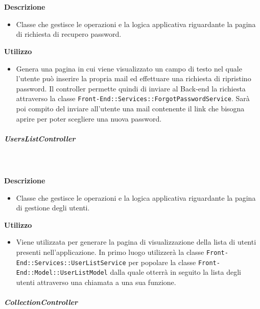         \textbf{\\ \\ Descrizione} 
          \begin{itemize}
            \item[] Classe che gestisce le operazioni e la logica applicativa riguardante la pagina di richiesta di recupero password.
          \end{itemize}      
        \textbf{Utilizzo}  
          \begin{itemize}
            \item[] Genera una pagina in cui viene visualizzato un campo di testo nel quale l'utente può inserire la propria mail ed effettuare una richiesta di ripristino password. Il controller permette quindi di inviare al Back-end la richiesta attraverso la classe \texttt{Front-End::Services::ForgotPasswordService}. Sarà poi compito del  inviare all'utente una mail contenente il link che bisogna aprire per poter scegliere una nuova password.
          \end{itemize}
      \subparagraph{UsersListController}
        
        \textbf{\\ \\ Descrizione} 
          \begin{itemize}
            \item[] Classe che gestisce le operazioni e la logica applicativa riguardante la pagina di gestione degli utenti.
          \end{itemize}      
        \textbf{Utilizzo}  
          \begin{itemize}
            \item[] Viene utilizzata per generare la pagina di visualizzazione della lista di utenti presenti nell'applicazione. In primo luogo utilizzerà la classe \texttt{Front-End::Services::UserListService} per popolare la classe \texttt{Front-End::Model::UserListModel} dalla quale otterrà in seguito la lista degli utenti attraverso una chiamata a una sua funzione.
          \end{itemize}
      \subparagraph{CollectionController}
        
